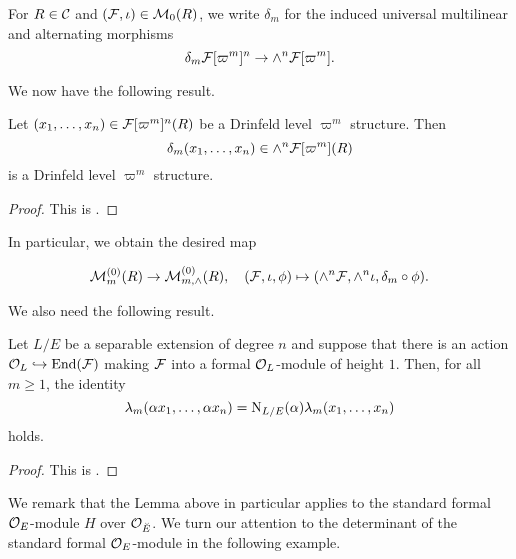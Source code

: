 \documentclass[../main.tex]{subfiles}
\begin{document}
For $R\in\mathcal{C}$ and $(\mathcal{F}, \iota) \in \mathcal{M}_{0}(R)$, we write $\delta_m$ for the
induced universal multilinear and alternating morphisms
\begin{equation*}
  \delta_m \mathcal{F}[\varpi^m]^n \to \wedge^n\mathcal{F}[\varpi^m].
\end{equation*}

We now have the following result.

\begin{lem}\label{lem:DeterminantOfDrinfeldStructure}
  Let $(x_1, \dots, x_n) \in \mathcal{F}[\varpi^{m}]^n(R)$ be a Drinfeld level
  $\varpi^m$ structure. Then 
  \begin{equation*}
    \delta_m(x_1, \dots, x_n) \in \wedge^n\mathcal{F}[\varpi^m](R) 
  \end{equation*}
  is a Drinfeld level $\varpi^m$ structure.
\begin{proof}
  This is \cite[Proposition 2.11]{weinstein2016semistable}.
\end{proof}
\end{lem}

In particular, we obtain the desired map

\begin{equation*}
  \mathcal{M}_m^{(0)}(R) \to \mathcal{M}^{(0)}_{m, \wedge}(R), \quad (\mathcal{F}, \iota, \phi)
  \mapsto (\wedge^n \mathcal{F}, \wedge^n \iota, \delta_m \circ \phi).
\end{equation*}

We also need the following result.

\begin{lem}\label{lem:WeinsteinDeterminantAndNorm}
  Let $L/E$ be a separable extension of degree $n$ and suppose that there 
  is an action $\mathcal{O}_L \hookrightarrow \operatorname{End}(\mathcal{F})$ making $\mathcal{F}$ into a formal $\mathcal{O}_L$-module
  of height $1$. Then, for all $m \geq 1$, the identity
  \begin{equation*}
    \lambda_m(\alpha x_1, \dots, \alpha x_n) = \mathrm{N}_{L/E}(\alpha) \lambda_m
    (x_1, \dots, x_n)
  \end{equation*}
  holds. 
  \begin{proof}
    This is \cite[Lemma 2.12]{weinstein2016semistable}.
  \end{proof}
\end{lem}

We remark that the Lemma above in particular applies to the standard formal 
$\mathcal{O}_E$-module $H$ over $\mathcal{O}_{\breve {E}}$. We turn our attention to the determinant of the standard
formal $\mathcal{O}_E$-module in the following example.
\end{document}
